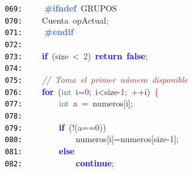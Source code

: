 \documentclass[a4paper,10pt]{scrartcl}
\begin{document}
{   \mbox{}\texttt{\textcolor{Black}{069:}} \textbf{\textcolor{RoyalBlue}{\ \ \ \ \#ifndef}}\ GRUPOS \\
   \mbox{}\texttt{\textcolor{Black}{070:}} \ \ \ \ \textcolor{TealBlue}{Cuenta}\ opActual\textcolor{BrickRed}{;} \\
   \mbox{}\texttt{\textcolor{Black}{071:}} \textbf{\textcolor{RoyalBlue}{\ \ \ \ \#endif}} \\
   \mbox{}\texttt{\textcolor{Black}{072:}} \ \  \\
   \mbox{}\texttt{\textcolor{Black}{073:}} \ \ \ \ \textbf{\textcolor{Blue}{if}}\ \textcolor{BrickRed}{(}size\ \textcolor{BrickRed}{\textless{}}\ \textcolor{Purple}{2}\textcolor{BrickRed}{)}\ \textbf{\textcolor{Blue}{return}}\ \textbf{\textcolor{Blue}{false}}\textcolor{BrickRed}{;} \\
   \mbox{}\texttt{\textcolor{Black}{074:}} \ \  \\
   \mbox{}\texttt{\textcolor{Black}{075:}} \ \ \ \ \textit{\textcolor{Brown}{//\ Toma\ el\ primer\ número\ disponible}} \\
   \mbox{}\texttt{\textcolor{Black}{076:}} \ \ \ \ \textbf{\textcolor{Blue}{for}}\ \textcolor{BrickRed}{(}\textcolor{ForestGreen}{int}\ i\textcolor{BrickRed}{=}\textcolor{Purple}{0}\textcolor{BrickRed}{;}\ i\textcolor{BrickRed}{\textless{}}size\textcolor{BrickRed}{-}\textcolor{Purple}{1}\textcolor{BrickRed}{;}\ \textcolor{BrickRed}{++}i\textcolor{BrickRed}{)}\ \textcolor{Red}{\{} \\
   \mbox{}\texttt{\textcolor{Black}{077:}} \ \ \ \ \ \ \ \ \textcolor{ForestGreen}{int}\ a\ \textcolor{BrickRed}{=}\ numeros\textcolor{BrickRed}{[}i\textcolor{BrickRed}{];} \\
   \mbox{}\texttt{\textcolor{Black}{078:}} \ \ \ \  \\
   \mbox{}\texttt{\textcolor{Black}{079:}} \ \ \ \ \ \ \ \ \textbf{\textcolor{Blue}{if}}\ \textcolor{BrickRed}{(!(}a\textcolor{BrickRed}{==}\textcolor{Purple}{0}\textcolor{BrickRed}{))} \\
   \mbox{}\texttt{\textcolor{Black}{080:}} \ \ \ \ \ \ \ \ \ \ \ \ numeros\textcolor{BrickRed}{[}i\textcolor{BrickRed}{]=}numeros\textcolor{BrickRed}{[}size\textcolor{BrickRed}{-}\textcolor{Purple}{1}\textcolor{BrickRed}{];} \\
   \mbox{}\texttt{\textcolor{Black}{081:}} \ \ \ \ \ \ \ \ \textbf{\textcolor{Blue}{else}} \\
   \mbox{}\texttt{\textcolor{Black}{082:}} \ \ \ \ \ \ \ \ \ \ \ \ \textbf{\textcolor{Blue}{continue}}\textcolor{BrickRed}{;} \\
}
\end{document}
